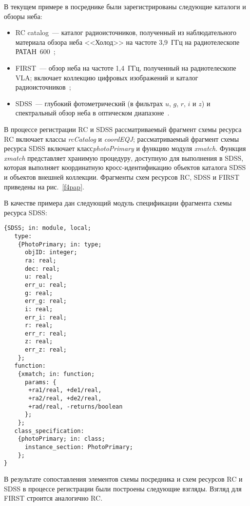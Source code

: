 \begin{multicols}{2}
     В текущем примере в посреднике были зарегистрированы следующие каталоги и
обзоры неба:
     \begin{itemize}
\item RC catalog~--- каталог радиоисточников, полученный из наблюдательного
материала обзора неба <<Холод>> на частоте 3,9~ГГц на радиотелескопе РАТАН~600~\cite{Par96};\\[-9pt]
\item FIRST~--- обзор неба на частоте 1,4~ГГц,  полученный на радиотелескопе
 VLA; включает коллекцию цифровых изображений и каталог радиоисточников~\cite{Beck};\\[-9pt]
\item SDSS~--- глубокий фотометрический (в фильтрах
$u$, $g$, $r$, $i$ и $z$) и спектральный обзор неба
в оптическом диапазоне~\cite{Sloan}.\\[-9pt]
\end{itemize}

     В процессе регистрации RC и SDSS рас\-смат\-ри\-ваемый фрагмент схемы ресурса RC
включает %
 классы \textit{rcCatalog} и \textit{coordEQJ}; рассматриваемый фрагмент схемы
ресурса SDSS включает класс\linebreak \textit{photoPrimary} и функцию модуля \textit{xmatch}.
Функция \textit{xmatch} пред\-став\-ля\-ет хранимую процедуру, доступную для выполнения в
SDSS, которая выполняет координатную кросс-идентификацию объектов каталога SDSS и
объектов внешней коллекции. Фрагменты схем ресурсов RC, SDSS и FIRST приведены на
рис.~\ref{f4pap}.

     В качестве примера дан следующий модуль спецификации фрагмента схемы
ресурса SDSS:
\begin{verbatim}
{SDSS; in: module, local;
   type:
    {PhotoPrimary; in: type;
      objID: integer;
      ra: real;
      dec: real;
      u: real;
      err_u: real;
      g: real;
      err_g: real;
      i: real;
      err_i: real;
      r: real;
      err_r: real;
      z: real;
      err_z: real;
    };
   function:
    {xmatch; in: function;
      params: {
       +ra1/real, +de1/real,
       +ra2/real, +de2/real,
       +rad/real, -returns/boolean
      };
    };
   class_specification:
    {photoPrimary; in: class;
      instance_section: PhotoPrimary;
    };
}
\end{verbatim}

     В результате сопоставления элементов схемы посредника и схем ресурсов RC и
SDSS в процессе регистрации были построены следующие взгляды. Взгляд для FIRST
строится аналогично RC.


\end{multicols}
